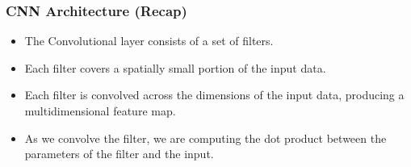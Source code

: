 











\begin{frame}[fragile] \frametitle{CNN Architecture (Recap)}

\begin{itemize}
\item The Convolutional layer consists of a set of filters.
\item Each filter covers a spatially small portion of the input data.
\item Each filter is convolved across the dimensions of the input data, producing a multidimensional feature map.
\item As we convolve the filter, we are computing the dot product between the parameters of the filter and the input.
\end{itemize}
\end{frame}


